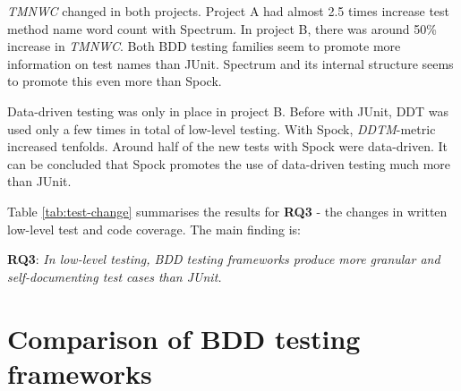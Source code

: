 \textit{TMNWC} changed in both projects. Project A had almost 2.5 times increase test method name word count with Spectrum. In
project B, there was around 50\% increase in \textit{TMNWC}. Both BDD testing families seem to promote more information on test
names than JUnit. Spectrum and its internal structure seems to promote this even more than Spock.

Data-driven testing was only in place in project B. Before with JUnit, DDT was used only a few times in total
of low-level testing. With Spock, \textit{DDTM}-metric increased tenfolds. Around half of the new tests with Spock were data-driven.
It can be concluded that Spock promotes the use of data-driven testing much more than JUnit.

Table \ref{tab:test-change} summarises the results for \textbf{RQ3} - the changes in written low-level test and code coverage.
The main finding is:

\begin{center}
\begin{topbot}
\textbf{RQ3}: \textit{In low-level testing, BDD testing frameworks produce more granular and self-documenting test cases than JUnit.}
\end{topbot}
\end{center}

\section{Comparison of BDD testing frameworks}

